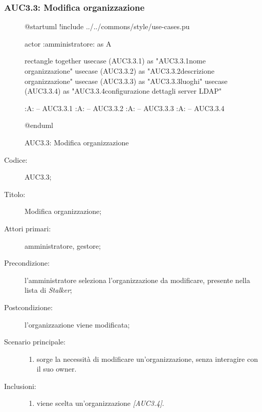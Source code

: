 \documentclass[../../../analisi-dei-requisiti.tex]{subfiles}
\begin{document}
\subsubsection{AUC3.3: Modifica organizzazione}%
\label{subs:AUC3.3}

\begin{figure}[H]
  \centering
  \begin{plantuml}
    @startuml
    !include ../../commons/style/use-cases.pu

    actor :amministratore: as A

    rectangle {
        together {
            usecase (AUC3.3.1) as "AUC3.3.1\nModifica nome organizzazione"
            usecase (AUC3.3.2) as "AUC3.3.2\nModifica descrizione organizzazione"
            usecase (AUC3.3.3) as "AUC3.3.3\nGestione luoghi"
            usecase (AUC3.3.4) as "AUC3.3.4\nModifica configurazione dettagli server LDAP"
          }
      }

    :A: -- AUC3.3.1
    :A: -- AUC3.3.2
    :A: -- AUC3.3.3
    :A: -- AUC3.3.4

    @enduml
  \end{plantuml}
  \caption{AUC3.3: Modifica organizzazione}%
  \label{fig:AUC3_3}
\end{figure}

\begin{description}
  \item[Codice:] AUC3.3;
  \item[Titolo:] Modifica organizzazione;
  \item[Attori primari:] amministratore, gestore;
  \item[Precondizione:] l'amministratore seleziona l'organizzazione da modificare, presente nella lista di \emph{Stalker};
  \item[Postcondizione:] l'organizzazione viene modificata;
  \item[Scenario principale:]
        \begin{enumerate}
          \item sorge la necessità di modificare un'organizzazione, senza interagire con il suo owner.
        \end{enumerate}
  \item[Inclusioni:]
        \begin{enumerate}
          \item viene scelta un'organizzazione \emph{[AUC3.4]}.
        \end{enumerate}
\end{description}
\end{document}

